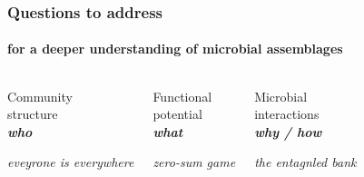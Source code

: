 \documentclass{beamer}
\begin{document}
   \begin{frame}
      \frametitle{Questions to address}
      \framesubtitle{for a deeper understanding of microbial assemblages}
      \begin{singlespace}


         \begin{columns}[onlytextwidth]
            

               \begin{center}

                  Community \\ structure   \\ \textbf{\textit{who}}  

                  \hrulefill

                  \scriptsize \textit{eveyrone is everywhere}

               \end{center}



               \begin{center}

                  Functional \\ potential \\ \textbf{\textit{what}}

                  \hrulefill

                  \scriptsize \textit{zero-sum game}

               \end{center}


               \begin{center}

                  Microbial \\ interactions \\ \textbf{\textit{why / how}}

                  \hrulefill

                  \scriptsize \textit{the entagnled bank}

               \end{center}
      

         \end{columns}

      \end{singlespace}

   \end{frame}
\end{document}
